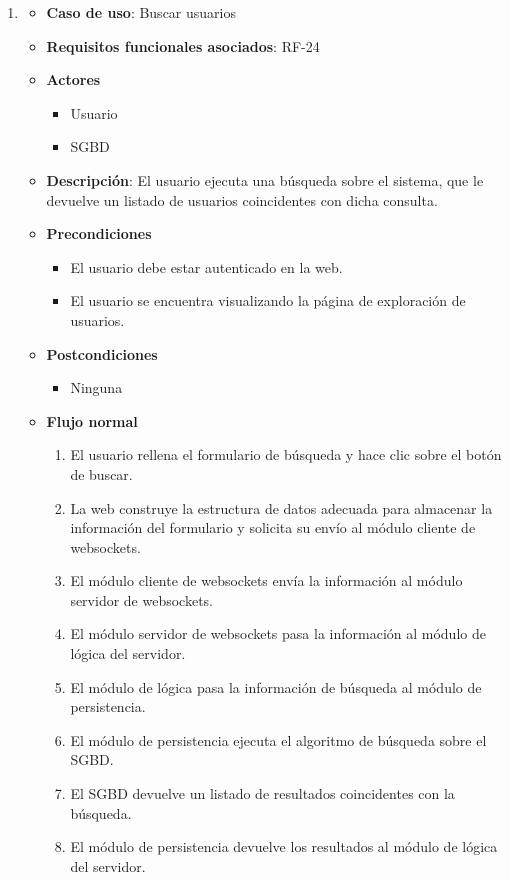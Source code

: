 \begin{enumerate}
\item %
  \begin{itemize}
  \item \textbf{Caso de uso}: Buscar usuarios
  \item \textbf{Requisitos funcionales asociados}: RF-24
  \item \textbf{Actores}
    \begin{itemize}
    \item Usuario
    \item SGBD
    \end{itemize}
  \item \textbf{Descripción}: El usuario ejecuta una búsqueda sobre el sistema, que le devuelve un listado de usuarios coincidentes con dicha consulta.
  \item \textbf{Precondiciones}
    \begin{itemize}
    \item El usuario debe estar autenticado en la web.
    \item El usuario se encuentra visualizando la página de exploración de usuarios.
    \end{itemize}
  \item \textbf{Postcondiciones}
    \begin{itemize}
    \item Ninguna
    \end{itemize}
  \item \textbf{Flujo normal}
    \begin{enumerate}
    \item El usuario rellena el formulario de búsqueda y hace clic sobre el botón de buscar.
    \item La web construye la estructura de datos adecuada para almacenar la información del formulario y solicita su envío al módulo cliente de websockets.
    \item El módulo cliente de websockets envía la información al módulo servidor de websockets.
    \item El módulo servidor de websockets pasa la información al módulo de lógica del servidor.
    \item El módulo de lógica pasa la información de búsqueda al módulo de persistencia.
    \item El módulo de persistencia ejecuta el algoritmo de búsqueda sobre el SGBD.
    \item El SGBD devuelve un listado de resultados coincidentes con la búsqueda.
    \item El módulo de persistencia devuelve los resultados al módulo de lógica del servidor.

\end{enumerate}
\end{itemize}
\end{enumerate}
